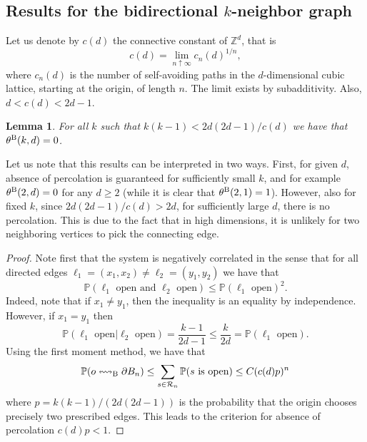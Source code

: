 \documentclass{article}
\newtheorem{lemma}[theorem]{Lemma}
\theoremstyle{definition}
\renewcommand{\P}{\mathbb{P}}
\newcommand{\1}{\mathbbm{1}}
\newcommand{\0}{\mathbf{o}}
\newcommand{\Z}{\mathbb{Z}}
\begin{document}
\subsection{Results for the bidirectional $k$-neighbor graph}
Let us denote by $c(d)$ the connective constant of $\Z^d$, that is $$c(d)=\lim_{n\uparrow\infty}c_n(d)^{1/n},$$
where $c_n(d)$ is the number of self-avoiding paths in the $d$-dimensional cubic lattice, starting at the origin, of length $n$. The limit exists by subadditivity. Also, $d<c(d)<2d-1$.  
\begin{lemma}
For all $k$ such that $k(k-1)<2d(2d-1)/c(d)$ we have that $\theta^{\rm B}(k,d)=0$.
\end{lemma}
Let us note that this results can be interpreted in two ways. First, for given $d$, absence of percolation is guaranteed for sufficiently small $k$, and for example $\theta^{\rm B}(2,d)=0$ for any $d\geq 2$ (while it is clear that $\theta^{\rm B}(2,1)=1$). However, also for fixed $k$, since $2d(2d-1)/c(d)>2d$, for sufficiently large $d$, there is no percolation. This is due to the fact that in high dimensions, it is unlikely for two neighboring vertices to pick the connecting edge. 
\begin{proof}
Note first that the system is negatively correlated in the sense that for all directed edges $\ell_1=(x_1,x_2)\neq\ell_2=(y_1,y_2)$ we have that
$$
\mathbb P(\ell_1\text{ open and }\ell_2\text{ open})\le \mathbb P(\ell_1\text{ open})^2.
$$
Indeed, note that if $x_1\neq y_1$, then the inequality is an equality by independence. However, if $x_1=y_1$ then 
$$
\mathbb P(\ell_1\text{ open}|\ell_2\text{ open})=\frac{k-1}{2d-1}\le \frac{k}{2d}=\mathbb P(\ell_1\text{ open}).
$$
Using the first moment method, we have that 
\begin{align*}
\P(o\leftrightsquigarrow_{\rm B}\partial B_n)\le \sum_{s\in \mathcal R_n}\P(s\text{ is open})\le C (c(d)p)^n 
\end{align*}
where $p=k(k-1)/(2d(2d-1))$ is the probability that the origin chooses precisely two prescribed edges. This leads to the criterion for absence of percolation $c(d)p<1$.
\end{proof}
\end{document}
